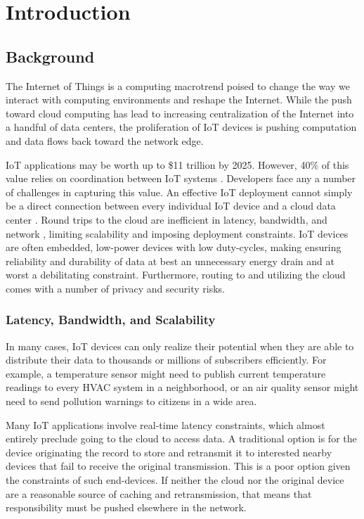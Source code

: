 \chapter{Introduction}
\label{intro}

\section{Background}
\label{background}

The Internet of Things is a computing macrotrend poised to change the way we interact with computing environments and reshape the Internet. While the push toward cloud computing has lead to increasing centralization of the Internet into a handful of data centers, the proliferation of IoT devices is pushing computation and data flows back toward the network edge.

IoT applications may be worth up to \$11 trillion by 2025. However, 40\% of this value relies on coordination between IoT systems \cite{McKinsey}. Developers face any a number of challenges in capturing this value. An effective IoT deployment cannot simply be a direct connection between every individual IoT device and a cloud data center \cite{kubi}. Round trips to the cloud are inefficient in  latency, bandwidth, and network , limiting scalability and imposing deployment constraints. IoT devices are often embedded, low-power devices with low duty-cycles, making ensuring reliability and durability of data at best an unnecessary energy drain and at worst a debilitating constraint. Furthermore, routing to and utilizing the cloud comes with a number of privacy and security risks.

\subsection{Latency, Bandwidth, and Scalability}
In many cases, IoT devices can only realize their potential when they are able to distribute their data to thousands or millions of subscribers efficiently. For example, a temperature sensor might need to publish current temperature readings to every HVAC system in a neighborhood, or an air quality sensor might need to send pollution warnings to citizens in a wide area. 

Many IoT applications involve real-time latency constraints, which almost entirely preclude going to the cloud to access data.  A traditional option is for the device originating the record to store and retransmit it to interested nearby devices that fail to receive the original transmission.  This is a poor option given the constraints of such end-devices.  If neither the cloud nor the original device are a reasonable source of caching and retransmission, that means that responsibility must be pushed elsewhere in the network.

